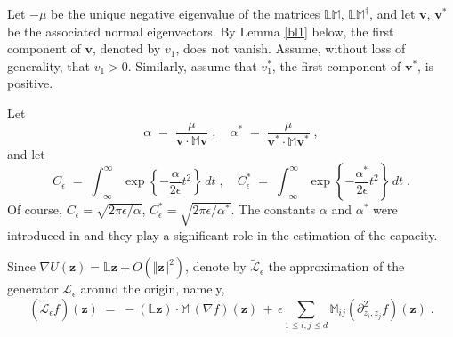 \documentclass[reqno]{amsart}
\newcounter{as}[section]
\newcommand{\mc}[1]{{\mathcal #1}}
\newcommand{\bb}[1]{{\mathbb #1}}
\newcommand{\bs}[1]{{\boldsymbol #1}}
\newcommand{\<}{\langle}
\renewcommand{\>}{\rangle}
\begin{document}
Let $-\mu$ be the unique negative eigenvalue of the matrices
$\bb{L} \bb M$, $\bb{L} \bb M^{\dagger}$, and let $\bs{v}$,
$\bs{v}^{*}$ be the associated normal eigenvectors. By Lemma \ref{bl1}
below, the first component of $\bs{v}$, denoted by $v_{1}$, does not
vanish. Assume, without loss of generality, that $v_{1}>0$.
Similarly, assume that $v_{1}^{*}$, the first component of $\bs{v}^*$,
is positive.

Let
\begin{equation}
\label{ins02}
\alpha\;=\;\frac{\mu}{\bs{v}\cdot\bb{M}\bs{v}}\;,
\quad \alpha^{*}\;=\;\frac{\mu}{\bs{v}^{*}\cdot\bb{M}\bs{v}^{*}}\;,
\end{equation}
and let
\begin{equation*}
C_{\epsilon}\;=\; \int_{-\infty}^{\infty}
\exp\left\{ -\frac{\alpha}{2\epsilon}t^{2}\right\} \, dt \;, \quad
C_{\epsilon}^{*} \;=\;\int_{-\infty}^{\infty}
\exp\left\{ -\frac{\alpha^{*}}{2\epsilon}t^{2}\right\} \,dt \;.
\end{equation*}
Of course, $C_{\epsilon} = \sqrt{2\pi\epsilon/\alpha}$,
$C^*_{\epsilon} = \sqrt{2\pi\epsilon/\alpha^*}$.  The constants
$\alpha$ and $\alpha^{*}$ were introduced in \cite{LS1} and they play
a significant role in the estimation of the capacity.
\smallskip

Since $\nabla U(\bs{z})= \bb{L}\bs{z}+O( \Vert \bs z\Vert^2)$, denote
by $\widetilde{\mc{L}}_{\epsilon}$ the approximation of the generator
$\mc{L}_{\epsilon}$ around the origin, namely,
\begin{equation*}
(\widetilde{\mc{L}}_{\epsilon}f) (\bs{z})\;=\;
-(\bb{L}\bs{z})\cdot\bb{M} \, (\nabla f)(\bs{z})
\,+\,\epsilon\sum_{1\le i,j\le d}\bb{M}_{ij}
(\partial^2_{z_{i},z_{j}}f)(\bs{z})\;.
\end{equation*}
\end{document}
